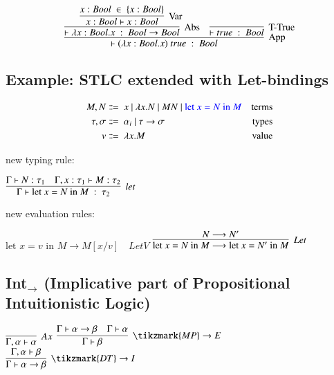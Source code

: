 \documentclass[9pt]{article}
\begin{document}
\[
    \infer[\text{App}]{\vdash (\lambda x : Bool.x)\ true\ :\ Bool}{
        \infer[\text{Abs}]{\vdash \lambda x : Bool . x\ :\ Bool \to Bool}{
            \infer[\text{Var}]{x:Bool \vdash x : Bool}{
                x: Bool\ \in\ \{x:Bool\}
            }
        }
        \quad
        \infer[\text{T-True}]{\vdash true\ :\ Bool}{}
    }
\]

\subsection{Example: STLC extended with Let-bindings}

\begin{align*}
    M,N          & \Coloneqq\ x\ |\ \lambda x . N\ |\ M N\ |\ {\color{blue}\text{let } x = N \text{ in } M} & \textnormal{terms} \\
    \tau, \sigma & \Coloneqq\ \alpha_{i}\ |\ \tau \to \sigma                                                & \textnormal{types} \\
    v            & \Coloneqq\ \lambda x . M                                                                 & \textnormal{value}
\end{align*}

new typing rule:

$\infer[let]{\Gamma \vdash \text{let } x = N \text{ in } M\ :\ \tau_2}{\Gamma \vdash N : \tau_1 \quad \Gamma, x:\tau_1\vdash M : \tau_2 }$

new evaluation rules:

$\text{let } x = v \text{ in } M \longrightarrow M[x/v] \quad LetV$
\hspace{1cm}
$\infer[Let]{\text{let } x = N \text{ in } M \longrightarrow \text{let } x = N' \text{ in } M}{N \longrightarrow N'}$


\subsection{Int$_{\to}$ (Implicative part of Propositional Intuitionistic Logic)}

$\infer[Ax]{\Gamma, \alpha \vdash \alpha}{}$ \hspace{0.5cm}
$\infer[\tikzmark{MP}\to E]{\Gamma \vdash \beta}{\Gamma \vdash \alpha \to \beta & \Gamma \vdash \alpha}$ \hspace{2.8cm}
$\infer[\tikzmark{DT}\to I]{\Gamma \vdash \alpha \to \beta}{\Gamma, \alpha \vdash \beta}$
\end{document}
